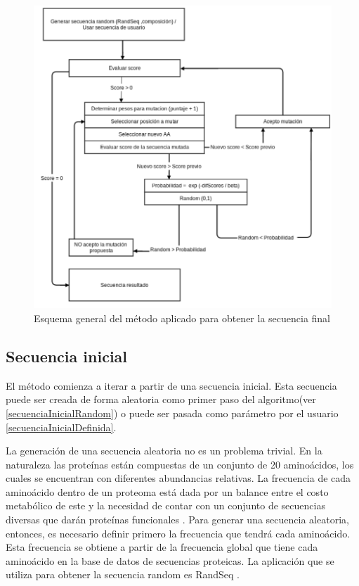 \begin{figure}[h!]
\centering
   \includegraphics[width=\textwidth]{img/diagrama-algoritmo-2.png}
 \caption{Esquema general del método aplicado para obtener la secuencia final}
 \label{fig:esquema-algoritmo}
\end{figure}



\subsection{Secuencia inicial}\label{seqInicial}

El método comienza a iterar a partir de una secuencia inicial. 
Esta secuencia puede ser creada de forma aleatoria como primer paso del 
algoritmo(ver \ref{secuenciaInicialRandom}) o puede ser pasada como parámetro por el usuario \ref{secuenciaInicialDefinida}. 

La generación de una secuencia aleatoria no es un problema trivial. 
En la naturaleza las proteínas están compuestas de un conjunto de 20 aminoácidos, los cuales se encuentran con diferentes abundancias relativas. 
La frecuencia de cada aminoácido dentro de un proteoma está dada por un balance entre el costo metabólico de este y la necesidad de contar con un conjunto de secuencias diversas que darán proteínas funcionales \cite{krick2014amino}. 
Para generar una secuencia aleatoria, entonces, es necesario definir primero la frecuencia que tendrá cada aminoácido. 
Esta frecuencia se obtiene a partir de la frecuencia global que tiene cada aminoácido en la base de datos de secuencias proteicas.
La aplicación que se utiliza para obtener la secuencia random es RandSeq \cite{randseq}.

